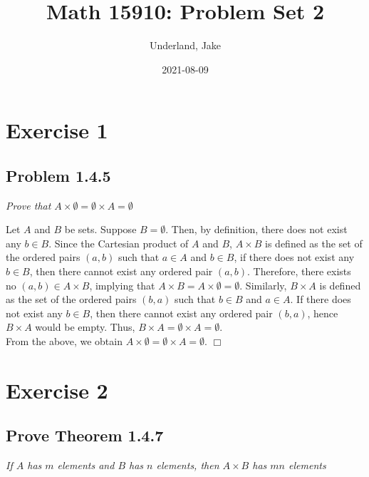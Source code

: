 \documentclass[
]{article}
\title{Math 15910: Problem Set 2}
\author{Underland, Jake}
\date{2021-08-09}
\begin{document}
\maketitle

{
\setcounter{tocdepth}{2}
\tableofcontents
}
\hypertarget{exercise-1}{%
\section{Exercise 1}\label{exercise-1}}

\hypertarget{problem-1.4.5}{%
\subsection{Problem 1.4.5}\label{problem-1.4.5}}

\emph{Prove that
\(A \times \emptyset = \emptyset \times A = \emptyset\)}

Let \(A\) and \(B\) be sets. Suppose \(B = \emptyset\). Then, by
definition, there does not exist any \(b \in B\). Since the Cartesian
product of \(A\) and \(B\), \(A \times B\) is defined as the set of the
ordered pairs \((a, b)\) such that \(a \in A\) and \(b \in B\), if there
does not exist any \(b \in B\), then there cannot exist any ordered pair
\((a, b)\). Therefore, there exists no \((a, b) \in A \times B\),
implying that \(A \times B = A \times \emptyset = \emptyset\).
Similarly, \(B \times A\) is defined as the set of the ordered pairs
\((b, a)\) such that \(b \in B\) and \(a \in A\). If there does not
exist any \(b \in B\), then there cannot exist any ordered pair
\((b, a)\), hence \(B \times A\) would be empty. Thus,
\(B \times A = \emptyset \times A = \emptyset\).\\
From the above, we obtain
\(A \times \emptyset = \emptyset \times A = \emptyset\). \hfill \(\Box\)

\hypertarget{exercise-2}{%
\section{Exercise 2}\label{exercise-2}}

\hypertarget{prove-theorem-1.4.7}{%
\subsection{Prove Theorem 1.4.7}\label{prove-theorem-1.4.7}}

\emph{If \(A\) has \(m\) elements and \(B\) has \(n\) elements, then
\(A \times B\) has \(mn\) elements}
\end{document}
